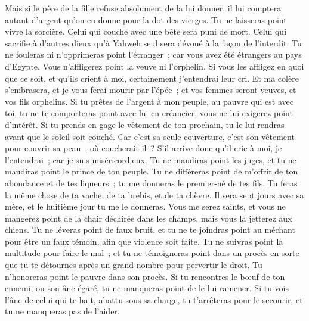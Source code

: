 \begin{multicols}{2}
Mais si le père de la fille refuse absolument de la lui donner, il lui comptera autant d'argent qu'on en donne pour la dot des vierges.
Tu ne laisseras point vivre la sorcière.
Celui qui couche avec une bête sera puni de mort.
Celui qui sacrifie à d'autres dieux qu'à Yahweh seul sera dévoué à la façon de l'interdit.
Tu ne fouleras ni n'opprimeras point l'étranger~; car vous avez été étrangers au pays d'Egypte.
Vous n'affligerez point la veuve ni l'orphelin.
Si vous les affligez en quoi que ce soit, et qu'ils crient à moi, certainement j'entendrai leur cri.
Et ma colère s'embrasera, et je vous ferai mourir par l'épée~; et vos femmes seront veuves, et vos fils orphelins.
Si tu prêtes de l'argent à mon peuple, au pauvre qui est avec toi, tu ne te comporteras point avec lui en créancier, vous ne lui exigerez point d'intérêt.
Si tu prends en gage le vêtement de ton prochain, tu le lui rendras avant que le soleil soit couché.
Car c'est sa seule couverture, c'est son vêtement pour couvrir sa peau~; où coucherait-il~? S'il arrive donc qu'il crie à moi, je l'entendrai~; car je suis miséricordieux.
Tu ne maudiras point les juges, et tu ne maudiras point le prince de ton peuple.
Tu ne différeras point de m'offrir de ton abondance et de tes liqueurs~; tu me donneras le premier-né de tes fils.
Tu feras la même chose de ta vache, de ta brebis, et de ta chèvre. Il sera sept jours avec sa mère, et le huitième jour tu me le donneras.
Vous me serez saints, et vous ne mangerez point de la chair déchirée dans les champs, mais vous la jetterez aux chiens.
\VerseOne{}Tu ne léveras point de faux bruit, et tu ne te joindras point au méchant pour être un faux témoin, afin que violence soit faite.
Tu ne suivras point la multitude pour faire le mal~; et tu ne témoigneras point dans un procès en sorte que tu te détournes après un grand nombre pour pervertir le droit.
Tu n'honoreras point le pauvre dans son procès.
Si tu rencontres le bœuf de ton ennemi, ou son âne égaré, tu ne manqueras point de le lui ramener.
Si tu vois l'âne de celui qui te hait, abattu sous sa charge, tu t'arrêteras pour le secourir, et tu ne manqueras pas de l'aider.

\end{multicols}
